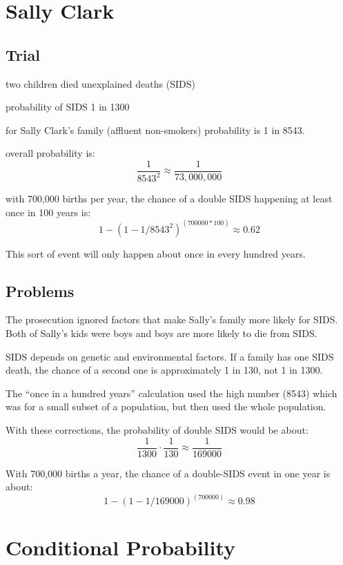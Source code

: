 \documentclass[landscape]{exam}
\begin{document}
  \section{Sally Clark}

  \subsection{Trial}
  \begin{itemize*}
    \item two children died unexplained deaths (SIDS)
    \item probability of SIDS 1 in 1300
    \item for Sally Clark's family (affluent non-smokers) probability is 1 in
      8543.
    \item overall probability is:
      \[
        \frac{1}{8543^2} \approx \frac{1}{73,000,000}
      \]

    \item with 700,000 births per year, the chance of a double SIDS happening at
      least once in 100 years is:
      \[
        1 - (1 - 1/8543^2)^(700000 * 100) \approx 0.62
      \]

      This sort of event will only happen about once in every hundred years.
  \end{itemize*}

  \subsection{Problems}

  The prosecution ignored factors that make Sally's family more likely for
  SIDS. Both of Sally's kids were boys and boys are more likely to die from
  SIDS.

  SIDS depends on genetic and environmental factors. If a family has one SIDS
  death, the chance of a second one is approximately 1 in 130, not 1 in 1300.

  The ``once in a hundred years'' calculation used the high number (8543)
  which was for a small subset of a population, but then used the whole
  population.

  With these corrections, the probability of double SIDS would be about:
  \[
    \frac{1}{1300} \cdot \frac{1}{130} \approx \frac{1}{169000} 
  \]

  With 700,000 births a year, the chance of a double-SIDS event in one year is
  about:
  \[
    1 - (1 - 1/169000)^(700000) \approx 0.98
  \]

  \section{Conditional Probability}
\end{document}
